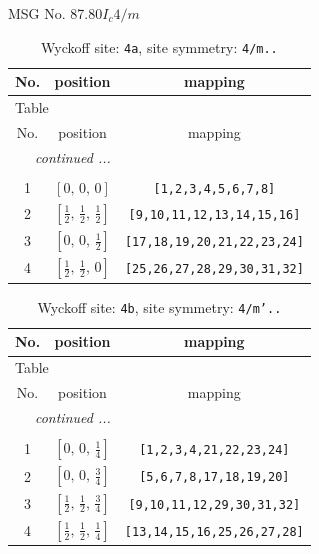 \documentclass[fleqn,8pt]{jsarticle}
\begin{document}
\setcounter{MaxMatrixCols}{32}

\renewcommand{\tablename}{Table~}
\renewcommand{\figurename}{Figure~}
\begin{center}
\LARGE
MSG No. 87.80\quad$I_{c}4/m$
\end{center}
\renewcommand{\arraystretch}{1.2}
\begin{longtable}{ccc}
\caption{Wyckoff site: {\tt 4a}, site symmetry: {\tt 4/m..}}
 \\
 \hline \hline
No. & position & mapping \\ \hline \endfirsthead

\multicolumn{2}{l}{\tablename\ \thetable{}} \\
 \hline \hline
No. & position & mapping \\ \hline \endhead

 \hline \hline
\multicolumn{2}{r}{\footnotesize\it continued ...} \\ \endfoot

 \hline \hline
\multicolumn{2}{r}{} \\ \endlastfoot

1 & $\left[ 0,\, 0,\, 0 \right]$ & {\tt [1,2,3,4,5,6,7,8]} \\ \hline
2 & $\left[ \frac{1}{2},\, \frac{1}{2},\, \frac{1}{2} \right]$ & {\tt [9,10,11,12,13,14,15,16]} \\ \hline
3 & $\left[ 0,\, 0,\, \frac{1}{2} \right]$ & {\tt [17,18,19,20,21,22,23,24]} \\ \hline
4 & $\left[ \frac{1}{2},\, \frac{1}{2},\, 0 \right]$ & {\tt [25,26,27,28,29,30,31,32]} \\
\end{longtable}
\renewcommand{\arraystretch}{1.2}
\begin{longtable}{ccc}
\caption{Wyckoff site: {\tt 4b}, site symmetry: {\tt 4/m'..}}
 \\
 \hline \hline
No. & position & mapping \\ \hline \endfirsthead

\multicolumn{2}{l}{\tablename\ \thetable{}} \\
 \hline \hline
No. & position & mapping \\ \hline \endhead

 \hline \hline
\multicolumn{2}{r}{\footnotesize\it continued ...} \\ \endfoot

 \hline \hline
\multicolumn{2}{r}{} \\ \endlastfoot

1 & $\left[ 0,\, 0,\, \frac{1}{4} \right]$ & {\tt [1,2,3,4,21,22,23,24]} \\ \hline
2 & $\left[ 0,\, 0,\, \frac{3}{4} \right]$ & {\tt [5,6,7,8,17,18,19,20]} \\ \hline
3 & $\left[ \frac{1}{2},\, \frac{1}{2},\, \frac{3}{4} \right]$ & {\tt [9,10,11,12,29,30,31,32]} \\ \hline
4 & $\left[ \frac{1}{2},\, \frac{1}{2},\, \frac{1}{4} \right]$ & {\tt [13,14,15,16,25,26,27,28]} \\
\end{longtable}
\end{document}
